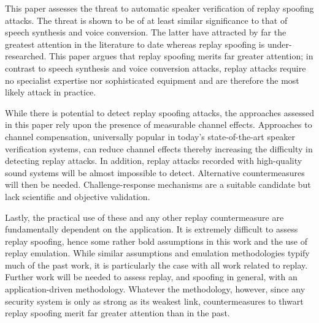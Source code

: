 
This paper assesses the threat to automatic speaker verification of replay spoofing attacks.  The threat is shown to be of at least similar significance to that of speech synthesis and voice conversion.  The latter have attracted by far the greatest attention in the literature to date whereas replay spoofing is under-researched.  This paper argues that replay spoofing merits far greater attention; in contrast to speech synthesis and voice conversion attacks, replay attacks require no specialist expertise nor sophisticated equipment and are therefore the most likely attack in practice.  

While there is potential to detect replay spoofing attacks, the approaches assessed in this paper rely upon the presence of measurable channel effects.  Approaches to channel compensation, universally popular in today's state-of-the-art speaker verification systems, can reduce channel effects thereby increasing the difficulty in detecting replay attacks.  In addition, replay attacks recorded with high-quality sound systems will be almost impossible to detect.  Alternative countermeasures will then be needed.  Challenge-response mechanisms are a suitable candidate but lack scientific and objective validation.

Lastly, the practical use of these and any other replay countermeasure are fundamentally dependent on the application.  It is extremely difficult to assess replay spoofing, hence some rather bold assumptions in this work and the use of replay emulation.  While similar assumptions and emulation methodologies typify much of the past work, it is particularly the case with all work related to replay.  Further work will be needed to assess replay, and spoofing in general, with an application-driven methodology.  Whatever the methodology, however, since any security system is only as strong as its weakest link, countermeasures to thwart replay spoofing merit far greater attention than in the past.